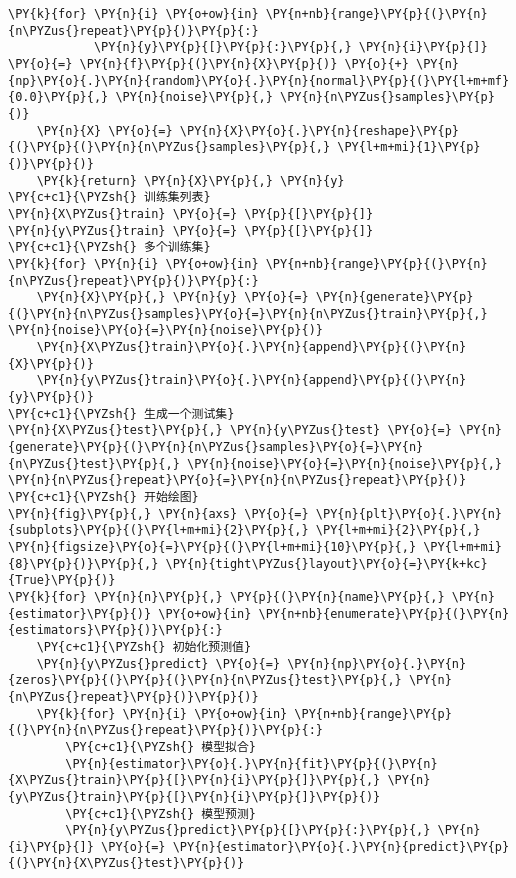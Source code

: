 \begin{Verbatim}[commandchars=\\\{\}]
        \PY{k}{for} \PY{n}{i} \PY{o+ow}{in} \PY{n+nb}{range}\PY{p}{(}\PY{n}{n\PYZus{}repeat}\PY{p}{)}\PY{p}{:}
            \PY{n}{y}\PY{p}{[}\PY{p}{:}\PY{p}{,} \PY{n}{i}\PY{p}{]} \PY{o}{=} \PY{n}{f}\PY{p}{(}\PY{n}{X}\PY{p}{)} \PY{o}{+} \PY{n}{np}\PY{o}{.}\PY{n}{random}\PY{o}{.}\PY{n}{normal}\PY{p}{(}\PY{l+m+mf}{0.0}\PY{p}{,} \PY{n}{noise}\PY{p}{,} \PY{n}{n\PYZus{}samples}\PY{p}{)}
    \PY{n}{X} \PY{o}{=} \PY{n}{X}\PY{o}{.}\PY{n}{reshape}\PY{p}{(}\PY{p}{(}\PY{n}{n\PYZus{}samples}\PY{p}{,} \PY{l+m+mi}{1}\PY{p}{)}\PY{p}{)}
    \PY{k}{return} \PY{n}{X}\PY{p}{,} \PY{n}{y}
\PY{c+c1}{\PYZsh{} 训练集列表}
\PY{n}{X\PYZus{}train} \PY{o}{=} \PY{p}{[}\PY{p}{]}
\PY{n}{y\PYZus{}train} \PY{o}{=} \PY{p}{[}\PY{p}{]}
\PY{c+c1}{\PYZsh{} 多个训练集}
\PY{k}{for} \PY{n}{i} \PY{o+ow}{in} \PY{n+nb}{range}\PY{p}{(}\PY{n}{n\PYZus{}repeat}\PY{p}{)}\PY{p}{:}
    \PY{n}{X}\PY{p}{,} \PY{n}{y} \PY{o}{=} \PY{n}{generate}\PY{p}{(}\PY{n}{n\PYZus{}samples}\PY{o}{=}\PY{n}{n\PYZus{}train}\PY{p}{,} \PY{n}{noise}\PY{o}{=}\PY{n}{noise}\PY{p}{)}
    \PY{n}{X\PYZus{}train}\PY{o}{.}\PY{n}{append}\PY{p}{(}\PY{n}{X}\PY{p}{)}
    \PY{n}{y\PYZus{}train}\PY{o}{.}\PY{n}{append}\PY{p}{(}\PY{n}{y}\PY{p}{)}
\PY{c+c1}{\PYZsh{} 生成一个测试集}
\PY{n}{X\PYZus{}test}\PY{p}{,} \PY{n}{y\PYZus{}test} \PY{o}{=} \PY{n}{generate}\PY{p}{(}\PY{n}{n\PYZus{}samples}\PY{o}{=}\PY{n}{n\PYZus{}test}\PY{p}{,} \PY{n}{noise}\PY{o}{=}\PY{n}{noise}\PY{p}{,} \PY{n}{n\PYZus{}repeat}\PY{o}{=}\PY{n}{n\PYZus{}repeat}\PY{p}{)}
\PY{c+c1}{\PYZsh{} 开始绘图}
\PY{n}{fig}\PY{p}{,} \PY{n}{axs} \PY{o}{=} \PY{n}{plt}\PY{o}{.}\PY{n}{subplots}\PY{p}{(}\PY{l+m+mi}{2}\PY{p}{,} \PY{l+m+mi}{2}\PY{p}{,} \PY{n}{figsize}\PY{o}{=}\PY{p}{(}\PY{l+m+mi}{10}\PY{p}{,} \PY{l+m+mi}{8}\PY{p}{)}\PY{p}{,} \PY{n}{tight\PYZus{}layout}\PY{o}{=}\PY{k+kc}{True}\PY{p}{)}
\PY{k}{for} \PY{n}{n}\PY{p}{,} \PY{p}{(}\PY{n}{name}\PY{p}{,} \PY{n}{estimator}\PY{p}{)} \PY{o+ow}{in} \PY{n+nb}{enumerate}\PY{p}{(}\PY{n}{estimators}\PY{p}{)}\PY{p}{:}
    \PY{c+c1}{\PYZsh{} 初始化预测值}
    \PY{n}{y\PYZus{}predict} \PY{o}{=} \PY{n}{np}\PY{o}{.}\PY{n}{zeros}\PY{p}{(}\PY{p}{(}\PY{n}{n\PYZus{}test}\PY{p}{,} \PY{n}{n\PYZus{}repeat}\PY{p}{)}\PY{p}{)}
    \PY{k}{for} \PY{n}{i} \PY{o+ow}{in} \PY{n+nb}{range}\PY{p}{(}\PY{n}{n\PYZus{}repeat}\PY{p}{)}\PY{p}{:}
        \PY{c+c1}{\PYZsh{} 模型拟合}
        \PY{n}{estimator}\PY{o}{.}\PY{n}{fit}\PY{p}{(}\PY{n}{X\PYZus{}train}\PY{p}{[}\PY{n}{i}\PY{p}{]}\PY{p}{,} \PY{n}{y\PYZus{}train}\PY{p}{[}\PY{n}{i}\PY{p}{]}\PY{p}{)}
        \PY{c+c1}{\PYZsh{} 模型预测}
        \PY{n}{y\PYZus{}predict}\PY{p}{[}\PY{p}{:}\PY{p}{,} \PY{n}{i}\PY{p}{]} \PY{o}{=} \PY{n}{estimator}\PY{o}{.}\PY{n}{predict}\PY{p}{(}\PY{n}{X\PYZus{}test}\PY{p}{)}

\end{Verbatim}
